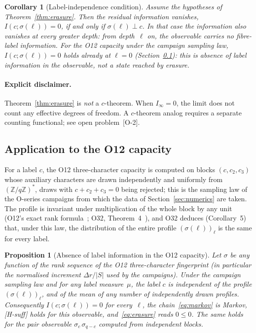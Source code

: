 \documentclass[11pt,a4paper]{article}
\theoremstyle{plain}
\newtheorem{corollary}[theorem]{Corollary}
\newtheorem{proposition}[theorem]{Proposition}
\theoremstyle{definition}
\theoremstyle{remark}
\begin{document}
    \begin{corollary}[Label-independence condition]
      \label{cor:fixedpoint}
      Assume the hypotheses of Theorem~\ref{thm:erasure}.
      Then the residual information vanishes, $I(c;\sigma(\ell)) = 0$, if and only if
      $\sigma(\ell) \perp c$.
      In that case the information also vanishes at every greater depth: from depth~$\ell$ on, the
      observable carries no fibre-label information.
      For the O12 capacity under the campaign sampling law, $I(c;\sigma(\ell)) = 0$ holds already
      at $\ell = 0$ (Section~\ref{sec:o12-application}): this is absence of label information in
      the observable, not a state reached by erasure.
    \end{corollary}

    \paragraph{Explicit disclaimer.}
      Theorem~\ref{thm:erasure} is \emph{not} a $c$-theorem.
      When $I_\infty = 0$, the limit does not count any effective degrees of freedom.
      A $c$-theorem analog requires a separate counting functional;
      see open problem~\textup{[O-2]}.

  \subsection{Application to the O12 capacity}
  \label{sec:o12-application}

    For a label $c$, the O12 three-character capacity is computed on blocks $(c, c_2, c_3)$
    whose auxiliary characters are drawn independently and uniformly from
    $(\mathbb{Z}/q\mathbb{Z})^*$, draws with $c + c_2 + c_3 = 0$ being rejected; this is the
    sampling law of the O-series campaigns from which the data of
    Section~\ref{sec:numerics} are taken.
    The profile is invariant under multiplication of the whole block by any unit (O12's exact
    rank formula~\cite{Beau2026a16}; O32, Theorem~4~\cite{Beau2026a36}), and O32 deduces
    (Corollary~5) that, under this law, the distribution of the entire profile
    $(\sigma(\ell))_{\ell}$ is the same for every label.

    \begin{proposition}[Absence of label information in the O12 capacity]
      \label{prop:o12-zero}
      Let $\sigma$ be any function of the rank sequence of the O12 three-character fingerprint
      (in particular the normalised increment $\Delta r/|S|$ used by the campaigns).
      Under the campaign sampling law and for any label measure~$\mu$, the label $c$ is
      independent of the profile $(\sigma(\ell))_{\ell}$, and of the mean of any number of
      independently drawn profiles.
      Consequently $I(c;\sigma(\ell)) = 0$ for every~$\ell$, the chain~\eqref{eq:markov} is
      Markov, \textup{[H-suff]} holds for this observable, and~\eqref{eq:erasure} reads
      $0 \leq 0$.
      The same holds for the pair observable $\sigma_c\,\sigma_{q-c}$ computed from independent
      blocks.
    \end{proposition}
\end{document}
